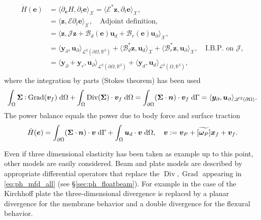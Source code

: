 \documentclass{svjour3}                     %
\newcommand{\secref}[1]{\S\ref{#1}}
\DeclareMathOperator*{\Grad}{Grad}
\DeclareMathOperator*{\Div}{Div}
\newcommand{\crmat}[1]{\ensuremath{\widetilde{\left[#1\right]}}}
\def\onedot{$\mathsurround0pt\ldotp$}
\def\cddot{%
	\mathbin{\vcenter{\baselineskip.67ex
			\hbox{\onedot}\hbox{\onedot}}%
}}
\newcommand{\firstRev}[1]{\textcolor{red!80!black}{#1}}
\begin{document}
	\begin{equation}
	\begin{aligned}
	\dot{H}(\bm{e}) &= \langle \partial_{\bm{e}} H, \partial_t {\bm{e}} \rangle_{\mathscr{X}} = \langle \bm{\mathcal{E}}^* \bm{z}, \partial_t {\bm{e}} \rangle_{\mathscr{X}}, \\
	&= \langle \bm{z}, \bm{\mathcal{E}} \partial_t {\bm{e}} \rangle_{\mathscr{X}}, \quad \text{Adjoint definition}, \\
	& = \langle \bm{z}, \bm{\mathcal{J}}\bm{z} + \bm{\mathcal{B}}_d(\bm{e}) \bm{u}_d + \bm{\mathcal{B}}_r(\bm{e}) \bm{u}_\partial \rangle_{\mathscr{X}}, \\
	& = \langle \bm{y}_\partial,  \bm{u}_\partial \rangle_{\mathscr{L}^2(\partial\Omega, \mathbb{R}^3)} + \langle \bm{\mathcal{B}}_d^* \bm{z}, \bm{u}_d \rangle_{\mathscr{X}} + \langle \bm{\mathcal{B}}_r^* \bm{z}, \bm{u}_\partial \rangle_{\mathscr{X}}, \quad \text{I.B.P. on } \bm{\mathcal{J}}, \\
	&= \langle \bm{y}_\partial + \bm{y}_r,  \bm{u}_\partial \rangle_{\mathscr{L}^2(\partial\Omega, \mathbb{R}^3)} + \langle \bm{y}_d,  \bm{u}_d \rangle_{\mathscr{L}^2(\Omega, \mathbb{R}^3)}, \\
	\end{aligned}
	\end{equation}
	where the integration by parts (Stokes theorem) has been used
	\begin{equation}
	\label{eq:stokes}
	\int_{\Omega} \bm\Sigma \cddot \Grad(\bm{v}_f) \d{\Omega} + \int_{\Omega} \Div(\bm\Sigma) \cdot \bm{v}_f \d{\Omega} = \int_{\partial \Omega} (\bm\Sigma \cdot \bm{n}) \cdot \bm{v}_f \d{\Gamma} = \langle \bm{y}_\partial,  \bm{u}_\partial \rangle_{\mathscr{L}^2(\partial\Omega)}.
	\end{equation}
	The power balance equals the power due to body force and surface traction
	\begin{equation}
	\dot{H}(\bm{e}) = \int_{\partial \Omega} (\bm{\Sigma} \cdot \bm{n}) \cdot \bm{v} \d\Gamma + \int_{\Omega} \bm{u}_d \cdot \bm{v}  \d{\Omega}, \quad \bm{v} := \bm{v}_P + \crmat{\bm{\omega}_P} \bm{x}_f + {\bm{v}}_f.
	\end{equation}
	
	\begin{remark}
		Even if three dimensional elasticity has been taken as example up to this point, other models are easily considered. Beam and plate models \cite{BRUGNOLI2019940,BRUGNOLI2019961} are described by appropriate differential operators that replace the $\Div, \Grad$ appearing in \eqref{eq:ph_mfd_all} (see \secref{sec:ph_floatbeam}). \firstRev{For example in the case of the Kirchhoff plate the three-dimensional divergence is replaced by a planar divergence  for the membrane behavior and a double divergence for the flexural behavior.}
	\end{remark}
	
\end{document}
